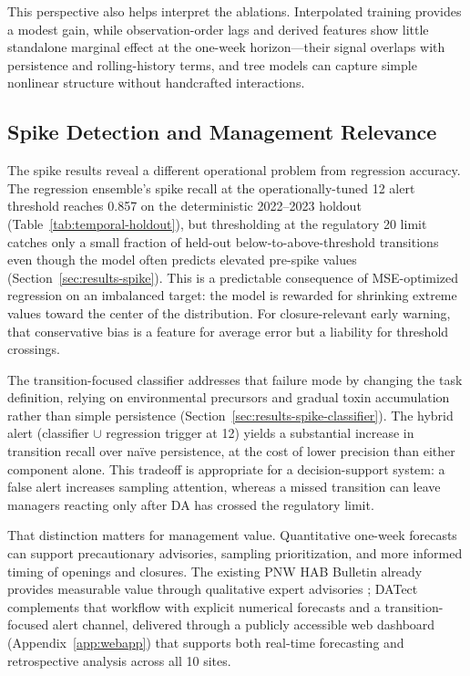 \documentclass[toxins,article,submit,moreauthors]{Definitions/mdpi}
\begin{document}
This perspective also helps interpret the ablations. Interpolated training provides a modest gain, while observation-order lags and derived features show little standalone marginal effect at the one-week horizon---their signal overlaps with persistence and rolling-history terms, and tree models can capture simple nonlinear structure without handcrafted interactions.

\subsection{Spike Detection and Management Relevance}
\label{sec:discussion-spike}

The spike results reveal a different operational problem from regression accuracy. The regression ensemble's spike recall at the operationally-tuned \SI{12}{\microgrampeg} alert threshold reaches 0.857 on the deterministic 2022--2023 holdout (Table~\ref{tab:temporal-holdout}), but thresholding at the regulatory \SI{20}{\microgrampeg} limit catches only a small fraction of held-out below-to-above-threshold transitions even though the model often predicts elevated pre-spike values (Section~\ref{sec:results-spike}). This is a predictable consequence of MSE-optimized regression on an imbalanced target: the model is rewarded for shrinking extreme values toward the center of the distribution. For closure-relevant early warning, that conservative bias is a feature for average error but a liability for threshold crossings.

The transition-focused classifier addresses that failure mode by changing the task definition, relying on environmental precursors and gradual toxin accumulation rather than simple persistence (Section~\ref{sec:results-spike-classifier}). The hybrid alert (classifier $\cup$ regression trigger at \SI{12}{\microgrampeg}) yields a substantial increase in transition recall over na\"ive persistence, at the cost of lower precision than either component alone. This tradeoff is appropriate for a decision-support system: a false alert increases sampling attention, whereas a missed transition can leave managers reacting only after DA has crossed the regulatory limit.

That distinction matters for management value. Quantitative one-week forecasts can support precautionary advisories, sampling prioritization, and more informed timing of openings and closures. The existing PNW HAB Bulletin already provides measurable value through qualitative expert advisories \cite{Jin2024}; DATect complements that workflow with explicit numerical forecasts and a transition-focused alert channel, delivered through a publicly accessible web dashboard (Appendix~\ref{app:webapp}) that supports both real-time forecasting and retrospective analysis across all 10 sites.
\end{document}
